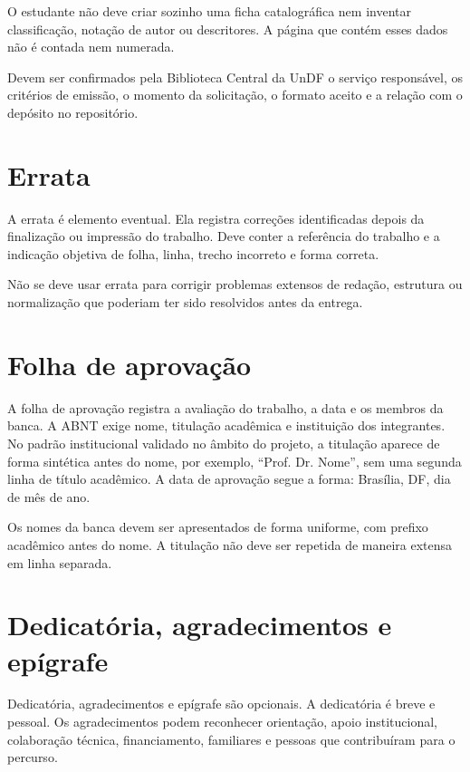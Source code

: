 O estudante não deve criar sozinho uma ficha catalográfica nem inventar classificação, notação de autor ou descritores. A página que contém esses dados não é contada nem numerada.

\fluxopendente

Devem ser confirmados pela Biblioteca Central da UnDF o serviço responsável, os critérios de emissão, o momento da solicitação, o formato aceito e a relação com o depósito no repositório.

\section{Errata}

A errata é elemento eventual. Ela registra correções identificadas depois da finalização ou impressão do trabalho. Deve conter a referência do trabalho e a indicação objetiva de folha, linha, trecho incorreto e forma correta.

Não se deve usar errata para corrigir problemas extensos de redação, estrutura ou normalização que poderiam ter sido resolvidos antes da entrega.

\section{Folha de aprovação}

A folha de aprovação registra a avaliação do trabalho, a data e os membros da banca. A ABNT exige nome, titulação acadêmica e instituição dos integrantes. No padrão institucional validado no âmbito do projeto, a titulação aparece de forma sintética antes do nome, por exemplo, ``Prof. Dr. Nome'', sem uma segunda linha de título acadêmico. A data de aprovação segue a forma: Brasília, DF, dia de mês de ano.

Os nomes da banca devem ser apresentados de forma uniforme, com prefixo acadêmico antes do nome. A titulação não deve ser repetida de maneira extensa em linha separada.

\decisaoinstitucional

\section{Dedicatória, agradecimentos e epígrafe}

Dedicatória, agradecimentos e epígrafe são opcionais. A dedicatória é breve e pessoal. Os agradecimentos podem reconhecer orientação, apoio institucional, colaboração técnica, financiamento, familiares e pessoas que contribuíram para o percurso.

